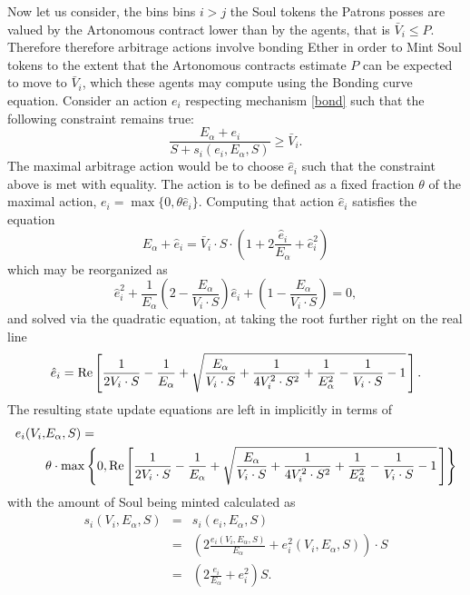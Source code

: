 \documentclass[11pt]{amsart}
\begin{document}
Now let us consider, the bins bins $i>j$ the Soul tokens the Patrons posses are valued by the Artonomous contract lower than by the agents, that is $\bar V_i \le P$. Therefore therefore arbitrage actions involve bonding Ether in order to Mint Soul tokens to the extent that the Artonomous contracts estimate $P$ can be expected to move to $\bar V_i$, which these agents may compute using the Bonding curve equation. Consider an action $e_i$ respecting mechanism \eqref{bond} such that the following constraint remains true:
\begin{equation}
\frac{E_\alpha +e_i}{S+s_i(e_i, E_\alpha, S)} \ge \bar V_i.
\end{equation}
The maximal arbitrage action would be to choose $\hat e_i$ such that the constraint above is met with equality. The action is to be defined as a fixed fraction $\theta$ of the maximal action, $e_i= \max \{0, \theta \hat e_i\}$. Computing that action $\hat e_i $ satisfies the equation
\begin{equation}
E_\alpha+\hat e_i  = \bar V_i \cdot S\cdot \left(1+2 \frac{\hat e_i}{E_\alpha}+\hat e_i^2 \right)
\end{equation}
which may be reorganized as
\begin{equation}
\hat e_i^2+ \frac{1}{E_\alpha}\left(2-\frac{E_\alpha}{V_i \cdot S}\right)\hat e_i + \left(1-\frac{E_\alpha}{ V_i \cdot S}\right) = 0,
\end{equation}
and solved via the quadratic equation, at taking the root further right on the real line
\begin{equation}
\hat e_i= \hbox{Re}\left[\frac{1}{2 V_i \cdot S}-\frac{1}{E_\alpha} + \sqrt{ \frac{E_\alpha}{V_i \cdot S}  +\frac{1}{4 V_i^2 \cdot S^2} + \frac{1}{E_\alpha^2}- \frac{1}{V_i \cdot S}  -1}\,\right]. \label{ehat}
\end{equation}
The resulting state update equations are left in implicitly in terms of
\begin{align}
e_i(V_i, &E_\alpha, S)  =\\ 
&\theta\cdot \max\left\{0, \hbox{Re}\left[\frac{1}{2 V_i \cdot S}-\frac{1}{E_\alpha} + \sqrt{ \frac{E_\alpha}{V_i \cdot S}  +\frac{1}{4 V_i^2 \cdot S^2} + \frac{1}{E_\alpha^2}- \frac{1}{V_i \cdot S}  -1}\,\right]\right\} \nonumber
\end{align}
with the amount of Soul being minted calculated as
\begin{eqnarray}
s_i(V_i, E_\alpha, S)&=&s_i(e_i,E_\alpha, S)\\
&=& \left(2\frac{e_i(V_i, E_\alpha, S)}{E_\alpha}+e^2_i(V_i, E_\alpha, S)\right)\cdot S\\
&=&\left(2\frac{e_i}{E_\alpha}+e^2_i\right)S.
\end{eqnarray}
\end{document}
